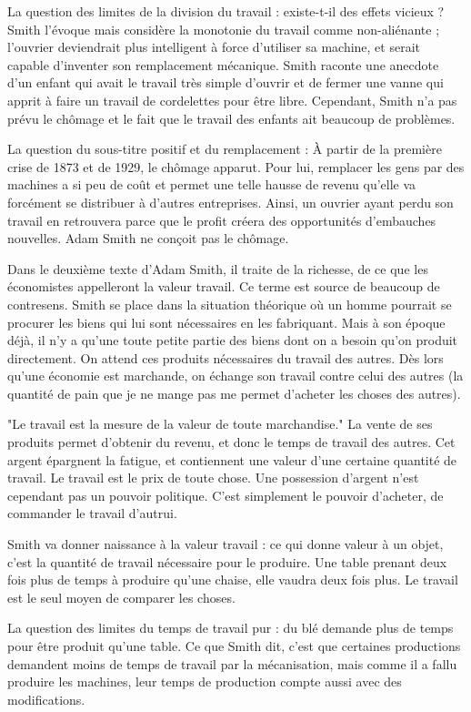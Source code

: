 \documentclass[a4paper,12pt]{book}
\begin{document}
\par La question des limites de la division du travail : existe-t-il des effets vicieux ? Smith l'évoque mais considère la monotonie du travail comme non-aliénante ; l'ouvrier deviendrait plus intelligent à force d'utiliser sa machine, et serait capable d'inventer son remplacement mécanique. Smith raconte une anecdote d'un enfant qui avait le travail très simple d'ouvrir et de fermer une vanne qui apprit à faire un travail de cordelettes pour être libre. Cependant, Smith n'a pas prévu le chômage et le fait que le travail des enfants ait beaucoup de problèmes.
\par La question du sous-titre positif et du remplacement : À partir de la première crise de 1873 et de 1929, le chômage apparut. Pour lui, remplacer les gens par des machines a si peu de coût et permet une telle hausse de revenu qu'elle va forcément se distribuer à d'autres entreprises. Ainsi, un ouvrier ayant perdu son travail en retrouvera parce que le profit créera des opportunités d'embauches nouvelles. Adam Smith ne conçoit pas le chômage.
\par Dans le deuxième texte d'Adam Smith, il traite de la richesse, de ce que les économistes appelleront la valeur travail. Ce terme est source de beaucoup de contresens. Smith se place dans la situation théorique où un homme pourrait se procurer les biens qui lui sont nécessaires en les fabriquant. Mais à son époque déjà, il n'y a qu'une toute petite partie des biens dont on a besoin qu'on produit directement. On attend ces produits nécessaires du travail des autres. Dès lors qu'une économie est marchande, on échange son travail contre celui des autres (la quantité de pain que je ne mange pas me permet d'acheter les choses des autres).
\par "Le travail est la mesure de la valeur de toute marchandise." La vente de ses produits permet d'obtenir du revenu, et donc le temps de travail des autres. Cet argent épargnent la fatigue, et contiennent une valeur d'une certaine quantité de travail. Le travail est le prix de toute chose. Une possession d'argent n'est cependant pas un pouvoir politique. C'est simplement le pouvoir d'acheter, de commander le travail d'autrui.
\par Smith va donner naissance à la valeur travail : ce qui donne valeur à un objet, c'est la quantité de travail nécessaire pour le produire. Une table prenant deux fois plus de temps à produire qu'une chaise, elle vaudra deux fois plus. Le travail est le seul moyen de comparer les choses.
\par La question des limites du temps de travail pur : du blé demande plus de temps pour être produit qu'une table. Ce que Smith dit, c'est que certaines productions demandent moins de temps de travail par la mécanisation, mais comme il a fallu produire les machines, leur temps de production compte aussi avec des modifications.
\end{document}
